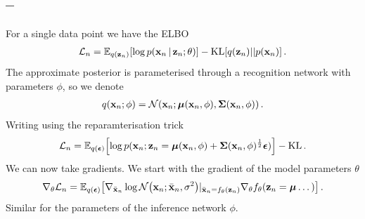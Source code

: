 \documentclass[a4paper]{article}
\newcommand{\questionref}[1]{\Cref{#1} -- \nameref{#1}}
\newcommand{\lb}{\mathcal{L}}
\theoremstyle{definition}
\begin{document}
\subsection{\questionref{q:vae}}
For a single data point we have the ELBO
\begin{align}
\lb_n = \Exp{q(\vz_n)}{\log p(\vx_n\given\vz_n; \theta)} - \KL{q(\vz_n)}{p(\vx_n)} \,.
\end{align}
The approximate posterior is parameterised through a recognition network with parameters $\phi$, so we denote
\begin{align}
q(\vx_n; \phi) = \NormDist{\vx_n; \vmu(\vx_n, \phi), \mathbf \Sigma(\vx_n, \phi)} \,.
\end{align}
Writing using the reparamterisation trick
\begin{align}
\lb_n = \Exp{q(\vepsilon)}{\log p(\vx_n; \vz_n=\vmu(\vx_n, \phi) + \mathbf\Sigma(\vx_n, \phi)^{\frac{1}{2}}\vepsilon)} - \mathrm{KL} \,.
\end{align}
We can now take gradients. We start with the gradient of the model parameters $\theta$
\begin{align}
\nabla_\theta\lb_n = \Exp{q(\vepsilon)}{\nabla_{\bar\vx_n} \log \NormDist{\vx_n; \bar\vx_n, \sigma^2}\vert_{\bar\vx_n = f_\theta(\vz_n)}\nabla_{\theta}f_\theta(\vz_n=\vmu\dots)} \,.
\end{align}
Similar for the parameters of the inference network $\phi$.









\printbibliography
\end{document}
